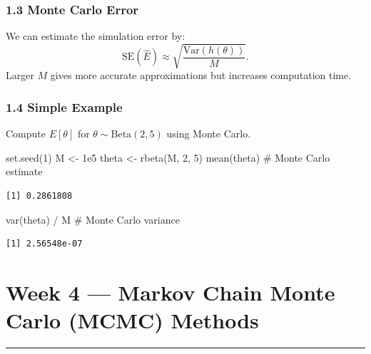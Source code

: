 \documentclass[
  letterpaper,
  DIV=11,
  numbers=noendperiod]{scrreprt}
\newenvironment{Shaded}{\begin{snugshade}}{\end{snugshade}}
\newcommand{\CommentTok}[1]{\textcolor[rgb]{0.37,0.37,0.37}{#1}}
\newcommand{\DecValTok}[1]{\textcolor[rgb]{0.68,0.00,0.00}{#1}}
\newcommand{\FloatTok}[1]{\textcolor[rgb]{0.68,0.00,0.00}{#1}}
\newcommand{\FunctionTok}[1]{\textcolor[rgb]{0.28,0.35,0.67}{#1}}
\newcommand{\NormalTok}[1]{\textcolor[rgb]{0.00,0.23,0.31}{#1}}
\newcommand{\OtherTok}[1]{\textcolor[rgb]{0.00,0.23,0.31}{#1}}
\newcommand{\SpecialCharTok}[1]{\textcolor[rgb]{0.37,0.37,0.37}{#1}}
\begin{document}
\subsection{1.3 Monte Carlo Error}\label{monte-carlo-error}

We can estimate the simulation error by: \[
\text{SE}(\hat{E}) \approx \sqrt{\frac{\text{Var}(h(\theta))}{M}}.
\] Larger \(M\) gives more accurate approximations but increases
computation time.

\subsection{1.4 Simple Example}\label{simple-example}

Compute \(E[\theta]\) for \(\theta \sim \text{Beta}(2,5)\) using Monte
Carlo.

\begin{Shaded}
\begin{Highlighting}[]
\FunctionTok{set.seed}\NormalTok{(}\DecValTok{1}\NormalTok{)}
\NormalTok{M }\OtherTok{\textless{}{-}} \FloatTok{1e5}
\NormalTok{theta }\OtherTok{\textless{}{-}} \FunctionTok{rbeta}\NormalTok{(M, }\DecValTok{2}\NormalTok{, }\DecValTok{5}\NormalTok{)}
\FunctionTok{mean}\NormalTok{(theta)          }\CommentTok{\# Monte Carlo estimate}
\end{Highlighting}
\end{Shaded}

\begin{verbatim}
[1] 0.2861808
\end{verbatim}

\begin{Shaded}
\begin{Highlighting}[]
\FunctionTok{var}\NormalTok{(theta) }\SpecialCharTok{/}\NormalTok{ M       }\CommentTok{\# Monte Carlo variance}
\end{Highlighting}
\end{Shaded}

\begin{verbatim}
[1] 2.56548e-07
\end{verbatim}


\chapter{Week 4 --- Markov Chain Monte Carlo (MCMC)
Methods}\label{week-4-markov-chain-monte-carlo-mcmc-methods}

\begin{center}\rule{0.5\linewidth}{0.5pt}\end{center}
\end{document}
